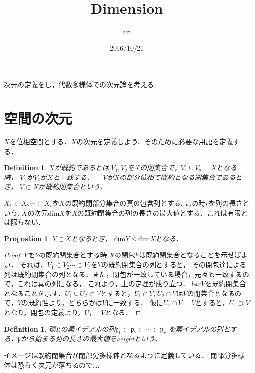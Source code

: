 \documentclass{ujarticle}
\title{Dimension}
\author{ari}
\date{2016/10/21}
\newtheorem{dfn}[thm]{Definition}
\newtheorem{prop}[thm]{Propostion}
\begin{document}
\maketitle
\tableofcontents

次元の定義をし，代数多様体での次元論を考える


\section{空間の次元}
\label{sec:空間の次元}

$X$を位相空間とする．$X$の次元を定義しよう．そのために必要な用語を定義する．
\begin{dfn}
 $X$が既約であるとは,$V_1,V_2$を$X$の閉集合で，$V_1 \cup V_2 =X$となる時，
 $V_1$か$V_2$が$X$と一致する．
　$V$が$X$の部分位相で既約となる閉集合であるとき， $V \subset X$が既約閉集合という．
\end{dfn}


$X_1 \subset X_2 \cdots  \subset X_r$を$X$の既約閉部分集合の真の包含列とする.
この時$r$を列の長さという.
$X$の次元$\mathrm{dim}X$を$X$の既約閉集合の列の長さの最大値とする．これは有限とは限らない．

\begin{prop}
 $Y \subset X$となるとき， $\mathrm{dim}Y \le \mathrm{dim}X$となる．
\end{prop}
\begin{proof}
 $V$を$Y$の既約閉集合とする時,$X$の閉包$\bar{V}$は既約閉集合となることを示せばよい．
 それは，$V_1 \subset V_2 \cdots \subset V_r$を$Y$の既約閉集合の列とすると，
 その閉包達による列は既約閉集合の列となる．また，閉包が一致している場合，元々も一致するので，これは真の列になる，
 これより，上の定理が成り立つ．
 $bar{V}$を既約閉集合となることを示す．$U_1 \cup U_2 \subset \bar{V}$とすると，$U_1 \cap Y$,
 $U_2 \cap V$は$V$の閉集合となるので，$V$の既約性より，どちらかは$V$に一致する．
 仮に$U_1 \cap V =V$とすると，$U_1 \supset V$となり，閉包の定義より，$U_1 =\bar{V}$となる．
\end{proof}



\begin{dfn}
 環$R$の素イデアルの列$\mathfrak{p}_1 \subset \mathfrak{p}_2 \subset \cdots \subset \mathfrak{p}_r$
 を素イデアルの列とする．$\mathfrak{p}$から始まる列の長さの最大値をheightという．
\end{dfn}
イメージは既約閉集合が閉部分多様体となるように定義している．
閉部分多様体は恐らく次元が落ちるので…．
\end{document}
